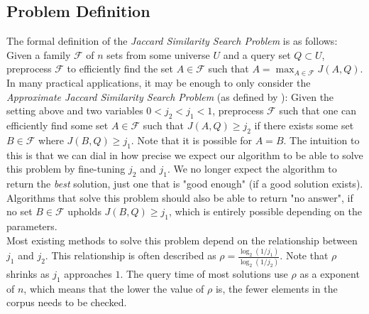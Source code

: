 \subsection{Problem Definition}
The formal definition of the \textit{Jaccard Similarity Search Problem} is as follows:
Given a family $\mathcal{F}$ of $n$ sets from some universe $U$ and a query set $Q\subset U$, preprocess $\mathcal{F}$ to efficiently find the set $A\in \mathcal{F}$ such that $A = \max_{A\in \mathcal{F}}J(A,Q)$. \\
In many practical applications, it may be enough to only consider the \textit{Approximate Jaccard Similarity Search Problem} (as defined by \citet{fast-similarity-search}): Given the setting above and two variables $0 < j_2 < j_1 < 1$, preprocess $\mathcal{F}$ such that one can efficiently find some set $A \in \mathcal{F}$ such that $J(A,Q) \geq j_2$ if there exists some set $B \in \mathcal{F}$ where $J(B,Q) \geq j_1$. Note that it is possible for $A = B$. The intuition to this is that we can dial in how precise we expect our algorithm to be able to solve this problem by fine-tuning $j_2$ and $j_1$. We no longer expect the algorithm to return the \textit{best} solution, just one that is "good enough" (if a good solution exists). Algorithms that solve this problem should also be able to return "no answer", if no set $B\in \mathcal{F}$ upholds $J(B,Q)\geq j_1$, which is entirely possible depending on the parameters. \\
Most existing methods to solve this problem depend on the relationship between $j_1$ and $j_2$. This relationship is often described as $\rho=\frac{\log_2(1/j_1)}{\log_2(1/j_2)}$. Note that $\rho$ shrinks as $j_1$ approaches $1$. The query time of most solutions use $\rho$ as a exponent of $n$, which means that the lower the value of $\rho$ is, the fewer elements in the corpus needs to be checked.

